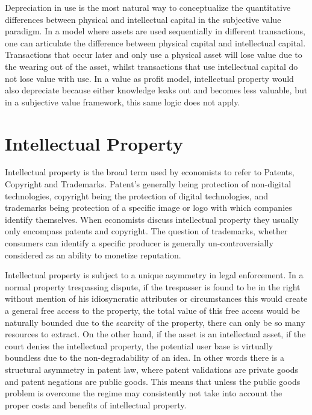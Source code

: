 \documentclass[12pt]{article}
\numberwithin{equation}{section}
\begin{document}
Depreciation in use is the most natural way to conceptualize the quantitative differences between physical and intellectual capital in the subjective value paradigm. In a model where assets are used sequentially in different transactions, one can articulate the difference between physical capital and intellectual capital. Transactions that occur later and only use a physical asset will lose value due to the wearing out of the asset, whilst transactions that use intellectual capital do not lose value with use. In a value as profit model, intellectual property would also depreciate because either knowledge leaks out and becomes less valuable, but in a subjective value framework, this same logic does not apply.

\section{Intellectual Property}

Intellectual property is the broad term used by economists to refer to Patents, Copyright and Trademarks. Patent's generally being protection of non-digital technologies, copyright being the protection of digital technologies, and trademarks being protection of a specific image or logo with which companies identify themselves. When economists discuss intellectual property they usually only encompass patents and copyright. The question of trademarks, whether consumers can identify a specific producer is generally un-controversially considered as an ability to monetize reputation.

Intellectual property is subject to a unique asymmetry in legal enforcement. In a normal property trespassing dispute, if the trespasser is found to be in the right without mention of his idiosyncratic attributes or circumstances this would create a general free access to the property, the total value of this free access would be naturally bounded due to the scarcity of the property, there can only be so many resources to extract. On the other hand, if the asset is an intellectual asset, if the court denies the intellectual property, the potential user base is virtually boundless due to the non-degradability of an idea. In other words there is a structural asymmetry in patent law, where patent validations are private goods and patent negations are public goods. This means that unless the public goods problem is overcome the regime may consistently not take into account the proper costs and benefits of intellectual property.
\end{document}
